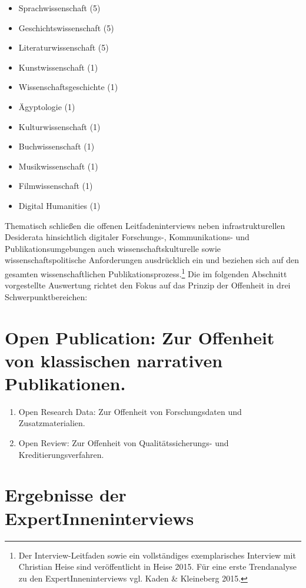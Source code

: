 \documentclass[a4paper,
fontsize=11pt,
oneside,
numbers=noperiodatend,
parskip=half-,
bibliography=totoc,
final
]{scrartcl}
\begin{document}
\begin{itemize}
\item
  Sprachwissenschaft (5)
\item
  Geschichtswissenschaft (5)
\item
  Literaturwissenschaft (5)
\item
  Kunstwissenschaft (1)
\item
  Wissenschaftsgeschichte (1)
\item
  Ägyptologie (1)
\item
  Kulturwissenschaft (1)
\item
  Buchwissenschaft (1)
\item
  Musikwissenschaft (1)
\item
  Filmwissenschaft (1)
\item
  Digital Humanities (1)
\end{itemize}

Thematisch schließen die offenen Leitfadeninterviews neben
infrastrukturellen Desiderata hinsichtlich digitaler Forschungs-,
Kommunikations- und Publikationsumgebungen auch wissenschaftskulturelle
sowie wissenschaftspolitische Anforderungen ausdrücklich ein und
beziehen sich auf den gesamten wissenschaftlichen
Publikationsprozess.\footnote{Der Interview-Leitfaden sowie ein
  vollständiges exemplarisches Interview mit Christian Heise sind
  veröffentlicht in Heise 2015. Für eine erste Trendanalyse zu den
  ExpertInneninterviews vgl. Kaden \& Kleineberg 2015.} Die im folgenden
Abschnitt vorgestellte Auswertung richtet den Fokus auf das Prinzip der
Offenheit in drei Schwerpunktbereichen:

\section{Open Publication: Zur Offenheit von klassischen narrativen
Publikationen.}\label{open-publication-zur-offenheit-von-klassischen-narrativen-publikationen.}

\begin{enumerate}
\def\labelenumi{\arabic{enumi}.}
\item
  Open Research Data: Zur Offenheit von Forschungsdaten und Zusatzmaterialien.
\item
  Open Review: Zur Offenheit von Qualitätssicherungs- und Kreditierungsverfahren.
\end{enumerate}

\section{Ergebnisse der
ExpertInneninterviews}\label{ergebnisse-der-expertinneninterviews}
\end{document}

